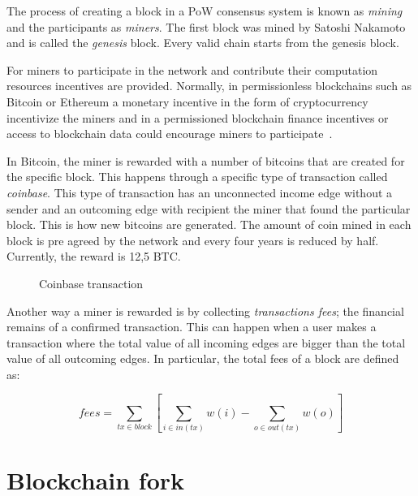 The process of creating a block in a PoW consensus system is known as \textit{mining} and the participants as \textit{miners}. The first block was mined by Satoshi Nakamoto~\cite{nakamoto2012bitcoin} and is called the \textit{genesis} block. Every valid chain starts from the genesis block.

For miners to participate in the network and contribute their computation resources incentives are provided. Normally, in permissionless blockchains such as Bitcoin or Ethereum a monetary incentive in the form of cryptocurrency incentivize the miners and in a permissioned blockchain finance incentives or access to blockchain data could encourage miners to participate~\cite{deloitte}.

In Bitcoin, the miner is rewarded with a number of bitcoins that are created for the specific block. This happens through a specific type of transaction called \textit{coinbase}. This type of transaction has an unconnected income edge without a sender and an outcoming edge with recipient the miner that found the particular block. This is how new bitcoins are generated. The amount of coin mined in each block is pre agreed by the network and every four years is reduced by half. Currently, the reward is 12,5 BTC.

\begin{figure}[!ht]
  \centering
  \caption{Coinbase transaction}
  \label{fig:mining:coinbase}
\end{figure}

Another way a miner is rewarded is by collecting \textit{transactions fees}; the financial remains of a confirmed transaction. This can happen when a user makes a transaction where the total value of all incoming edges are bigger than the total value of all outcoming edges. In particular, the total fees of a block are defined as:

\begin{equation*}
  fees = \sum_{tx \in block} [ \sum_{i \in in(tx) }w(i) -  \sum_{o \in out(tx) }w(o)]
\end{equation*}

\section{Blockchain fork}\label{blockchain:fork}

